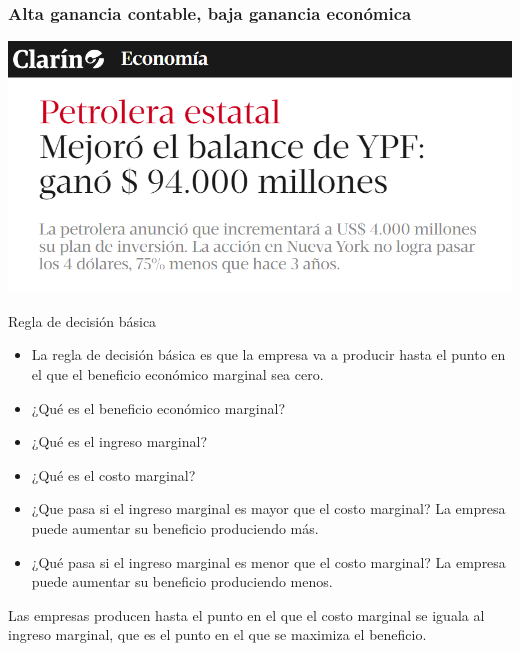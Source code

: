 \documentclass{beamer}
\begin{document}
\begin{frame}
    \frametitle{Alta ganancia contable, baja ganancia económica}
    \centering
    \includegraphics[scale=0.6]{../YPF.png}
\end{frame}

\begin{frame}{Regla de decisión básica}

    \begin{itemize}
        \item La regla de decisión básica es que la empresa va a producir hasta el punto en el que el beneficio económico marginal sea cero.
        \item ¿Qué es el beneficio económico marginal?
        \item ¿Qué es el ingreso marginal?
        \item ¿Qué es el costo marginal?
        \item ¿Que pasa si el ingreso marginal es mayor que el costo marginal? La empresa puede aumentar su beneficio produciendo más.
        \item ¿Qué pasa si el ingreso marginal es menor que el costo marginal? La empresa puede aumentar su beneficio produciendo menos.
    \end{itemize}

    \begin{boxA}
        \begin{center}
            Las empresas producen hasta el punto en el que el costo marginal se iguala al ingreso marginal, que es el punto en el que se maximiza el beneficio.
        \end{center}
    \end{boxA}
\end{frame}
\end{document}
